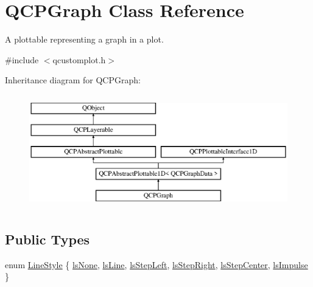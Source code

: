 \hypertarget{class_q_c_p_graph}{}\section{Q\+C\+P\+Graph Class Reference}
\label{class_q_c_p_graph}


A plottable representing a graph in a plot.  




{\ttfamily \#include $<$qcustomplot.\+h$>$}

Inheritance diagram for Q\+C\+P\+Graph\+:\begin{figure}[H]
\begin{center}
\leavevmode
\includegraphics[height=5.000000cm]{d2/d4c/class_q_c_p_graph}
\end{center}
\end{figure}
\subsection*{Public Types}
\begin{DoxyCompactItemize}
\item 
enum \mbox{\hyperlink{class_q_c_p_graph_ad60175cd9b5cac937c5ee685c32c0859}{Line\+Style}} \{ \newline
\mbox{\hyperlink{class_q_c_p_graph_ad60175cd9b5cac937c5ee685c32c0859aea9591b933733cc7b20786b71e60fa04}{ls\+None}}, 
\mbox{\hyperlink{class_q_c_p_graph_ad60175cd9b5cac937c5ee685c32c0859a3c42a27b15aa3c92d399082fad8b7515}{ls\+Line}}, 
\mbox{\hyperlink{class_q_c_p_graph_ad60175cd9b5cac937c5ee685c32c0859ae10568bda57836487d9dec5eba1d6c6e}{ls\+Step\+Left}}, 
\mbox{\hyperlink{class_q_c_p_graph_ad60175cd9b5cac937c5ee685c32c0859a9c37951f7d11aa070100fd16f2935c9e}{ls\+Step\+Right}}, 
\newline
\mbox{\hyperlink{class_q_c_p_graph_ad60175cd9b5cac937c5ee685c32c0859a5adf7b04da215a40a764c21294ea7366}{ls\+Step\+Center}}, 
\mbox{\hyperlink{class_q_c_p_graph_ad60175cd9b5cac937c5ee685c32c0859aa3b358b4ae7cca94aceeb8e529c12ebb}{ls\+Impulse}}
 \}
\end{DoxyCompactItemize}

